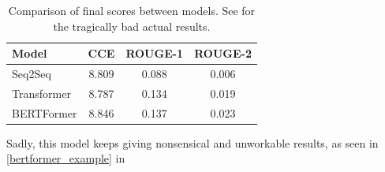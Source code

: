 \begin{table}[h]
	\centering
	\footnotesize
	\begin{tabular}{l | c c c}
		\toprule
			Model & CCE & ROUGE-1 & ROUGE-2 \\
		\midrule
			Seq2Seq & 8.809 & 0.088 & 0.006 \\
			Transformer & 8.787 & 0.134 & 0.019 \\
			BERTFormer & 8.846 & 0.137 & 0.023 \\
		\bottomrule
	\end{tabular}
	\caption{Comparison of final scores between models. See \appendixA{} for the tragically bad actual results.}
	\label{comparison_table}
\end{table}

Sadly, this model keeps giving nonsensical and unworkable results, as seen in \cref{bertformer_example} in \appendixA{}
